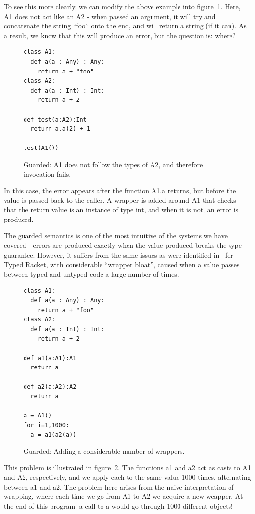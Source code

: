 \documentclass[a4paper,USenglish]{tex/lipics-v2016}
\begin{document}
To see this more clearly, we can modify the above example into
figure~\ref{fig:guard2}. Here, A1 does not act like an A2 - when passed an
argument, it will try and concatenate the string ``foo'' onto the end, and
will return a string (if it can). As a result, we know that this will
produce an error, but the question is: where?

\begin{figure}[h]
\begin{verbatim}
class A1:
  def a(a : Any) : Any:
    return a + "foo"
class A2:
  def a(a : Int) : Int:
    return a + 2

def test(a:A2):Int
  return a.a(2) + 1

test(A1())
\end{verbatim}
\caption{Guarded: A1 does not follow the types of A2, and therefore invocation fails.}
\label{fig:guard2}
\end{figure}

In this case, the error appears after the function A1.a returns, but before
the value is passed back to the caller. A wrapper is added around A1 that
checks that the return value is an instance of type int, and when it is not,
an error is produced.

The guarded semantics is one of the most intuitive of the systems we have
covered - errors are produced exactly when the value produced breaks the
type guarantee. However, it suffers from the same issues as were identified
in~\cite{practical-gt} for Typed Racket, with considerable ``wrapper
bloat'', caused when a value passes between typed and untyped code a large
number of times.

\begin{figure}[h]
\begin{verbatim}
class A1:
  def a(a : Any) : Any:
    return a + "foo"
class A2:
  def a(a : Int) : Int:
    return a + 2

def a1(a:A1):A1
  return a

def a2(a:A2):A2
  return a

a = A1()
for i=1,1000:
  a = a1(a2(a))
\end{verbatim}
\caption{Guarded: Adding a considerable number of wrappers.}
\label{fig:guard3}
\end{figure}

This problem is illustrated in figure~\ref{fig:guard3}. The functions a1 and
a2 act as casts to A1 and A2, respectively, and we apply each to the same
value 1000 times, alternating between a1 and a2. The problem here arises
from the naive interpretation of wrapping, where each time we go from A1 to
A2 we acquire a new weapper. At the end of this program, a call to a would
go through 1000 different objects!
\end{document}
